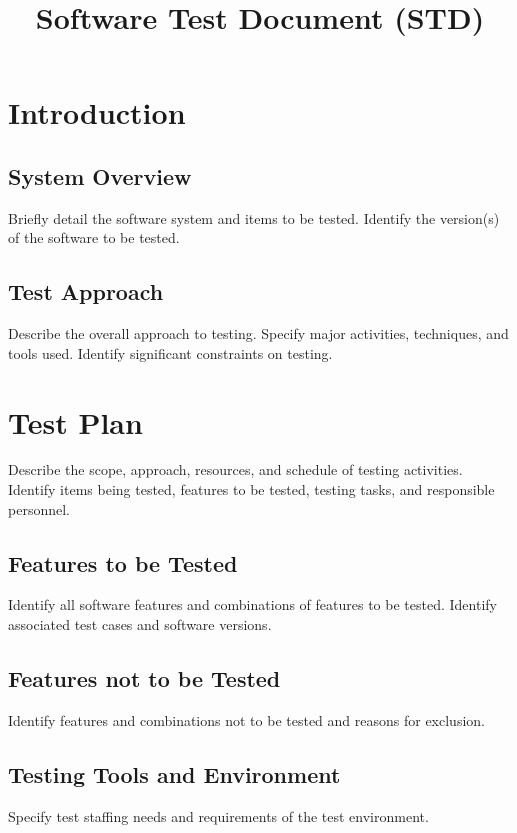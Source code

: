 \documentclass{article}
\title{Software Test Document (STD)}
\author{}
\date{}
\begin{document}
\maketitle

\section{Introduction}

\subsection{System Overview}
Briefly detail the software system and items to be tested. Identify the version(s) of the software to be tested.

\subsection{Test Approach}
Describe the overall approach to testing. Specify major activities, techniques, and tools used. Identify significant constraints on testing.

\section{Test Plan}

Describe the scope, approach, resources, and schedule of testing activities. Identify items being tested, features to be tested, testing tasks, and responsible personnel.

\subsection{Features to be Tested}

Identify all software features and combinations of features to be tested. Identify associated test cases and software versions.

\subsection{Features not to be Tested}

Identify features and combinations not to be tested and reasons for exclusion.

\subsection{Testing Tools and Environment}

Specify test staffing needs and requirements of the test environment.
\end{document}
